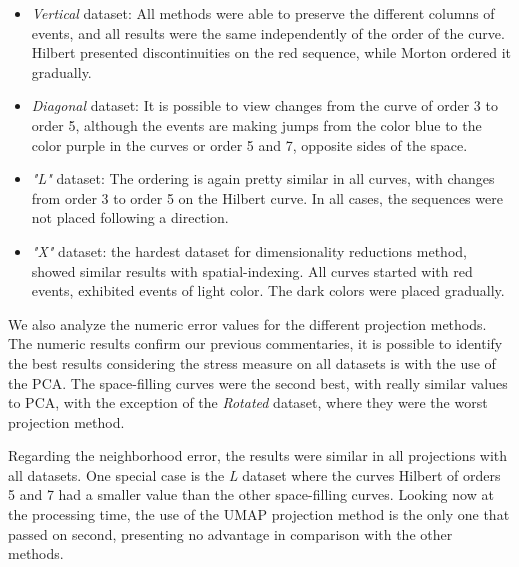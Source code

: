 \begin{itemize}
    \item \textit{Vertical} dataset: All methods were able to preserve the different columns of events, and all results were the same independently of the order of the curve. Hilbert presented discontinuities on the red sequence, while Morton ordered it gradually.
    \item \textit{Diagonal} dataset: It is possible to view changes from the curve of order 3 to order 5, although the events are making jumps from the color blue to the color purple in the curves or order 5 and 7, opposite sides of the space.
    \item \textit{"L"} dataset:  The ordering is again pretty similar in all curves, with changes from order 3 to order 5 on the Hilbert curve. In all cases, the sequences were not placed following a direction.
    \item \textit{"X"} dataset: the hardest dataset for dimensionality reductions method, showed similar results with spatial-indexing. All curves started with red events, exhibited events of light  color. The dark colors were placed gradually.
\end{itemize}





We also analyze the numeric error values for the different projection methods.
%
The numeric results confirm our previous commentaries, it is possible to identify the best results considering the stress measure on all datasets is with the use of the PCA.
%
The space-filling curves were the second best, with really similar values to PCA, with the exception of the \textit{Rotated} dataset, where they were the worst projection method.
%

Regarding the neighborhood error, the results were similar in all projections with all datasets. One special case is the \textit{L} dataset where the curves Hilbert of orders 5 and 7 had a smaller value than the other space-filling curves.
%
Looking now at the processing time, the use of the UMAP projection method is the only one that passed on second, presenting no advantage in comparison with the other methods.

